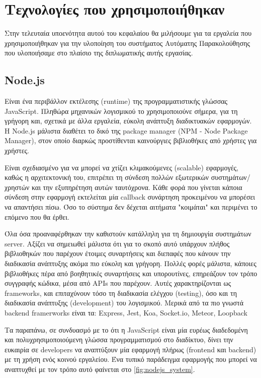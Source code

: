 \section{Τεχνολογίες που χρησιμοποιήθηκαν}
\label{section:tools}

Στην τελευταία υποενότητα αυτού του κεφαλαίου θα μιλήσουμε για τα εργαλεία που χρησιμοποιήθηκαν
για την υλοποίηση του συστήματος Αυτόματης Παρακολούθησης που υλοποιήσαμε στο πλαίσιο της διπλωματικής
αυτής εργασίας.

\subsection{Node.js}
\label{subsec:nodejs}

Είναι ένα περιβάλλον εκτέλεσης (runtime) της προγραμματιστικής γλώσσας JavaScript.
Πληθώρα μηχανικών λογισμικού το χρησιμοποιούνε σήμερα, για τη γρήγορη και, σχετικά με άλλα εργαλεία,
εύκολη ανάπτυξη διαδικτυακών εφαρμογών. Η Node.js μάλιστα διαθέτει το δικό της package manager
(ΝPM - Node Package Manager), στον οποίο διαρκώς προστίθενται καινούργιες βιβλιοθήκες
από χρήστες για χρήστες. 

Είναι σχεδιασμένο για να μπορεί να χτίζει κλιμακούμενες (scalable) εφαρμογές, καθώς η αρχιτεκτονική του,
επιτρέπει τη σύνδεση πολλών εξωτερικών συστημάτων/χρηστών και την εξυπηρέτηση αυτών ταυτόχρονα. Κάθε φορά που γίνεται κάποια σύνδεση στην εφαρμογή εκτελείται μία callback συνάρτηση προκειμένου να μπορέσει να απαντήσει πίσω.
Όσο το σύστημα δεν δέχεται αιτήματα "κοιμάται" και περιμένει το επόμενο που θα έρθει.

Όλα όσα προαναφέρθηκαν την καθιστούν κατάλληλη για τη δημιουργία συστημάτων server. Αξίζει να σημειωθεί μάλιστα ότι για το σκοπό
αυτό υπάρχουν πλήθος βιβλιοθηκών που παρέχουν έτοιμες συναρτήσεις και διεπαφές που κάνουν την διαδικασία ανάπτυξης ακόμα πιο εύκολη
και γρήγορη. Πολλές φορές μάλιστα, κάποιες βιβλιοθήκες πέρα από βοηθητικές συναρτήσεις και υπορουτίνες, επηρεάζουν τον τρόπο
συγγραφής κώδικα, μέσα από APIs που παρέχουν. Αυτές χαρακτηρίζονται ως frameworks, και επιταχύνουν τόσο τη διαδικασία
ελέγχου (testing), όσο και τη διαδικασία ανάπτυξης (development) του λογισμικού. Μερικά από τα πιο γνωστά
backend framerworks είναι τα: Express, Jest, Koa, Socket.io, Meteor, Loopback

Τα παραπάνω, σε συνδυασμό με το ότι η JavaScript είναι μία ευρέως διαδεδομένη και πολυχρησιμοποιούμενη γλώσσα
προγραμματισμού στο διαδίκτυο, δίνει την ευκαιρία σε developers να αναπτύξουν μία εφαρμογή πλήρως
(frontend και backend) με τη χρήση ενός κοινού εργαλείου. Ένα τυπικό παράδειγμα εφαρμογής που μπορεί να
αναπτυχθεί με τον τρόπο αυτό φαίνεται στο \autoref{fig:nodejs_system}.

